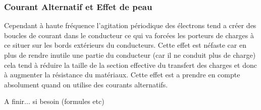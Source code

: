 \documentclass[12pt,a4paper]{article}
\begin{document}
\subsubsection{Courant Alternatif et Effet de peau}

Cependant à haute fréquence l'agitation périodique des électrons tend a créer des boucles de courant dans le conducteur ce qui va forcées les porteurs de charges à ce situer sur les bords extérieurs du conducteurs. Cette effet est néfaste car en plus de rendre inutile une partie du conducteur (car il ne conduit plus de charge) cela tend à réduire la taille de la section effective du transfert des charges et donc à augmenter la résistance du matériaux. Cette effet est a prendre en compte absolument quand on utilise des courants alternatifs. 

A finir... si besoin (formules etc)
\end{document}
